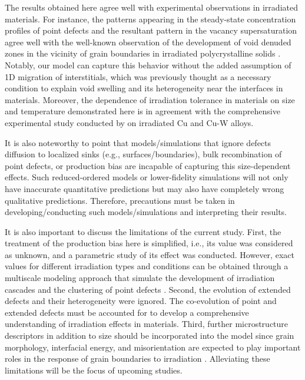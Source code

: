 \documentclass[utf8]{frontiersSCNS} %
\begin{document}
The results obtained here agree well with experimental observations in irradiated materials. For instance, the patterns appearing in the steady-state concentration profiles of point defects and the resultant pattern in the vacancy supersaturation agree well with the well-known observation of the development of void denuded zones in the vicinity of grain boundaries in irradiated polycrystalline solids \citep{was2017}. Notably, our model can capture this behavior without the added assumption of 1D migration of interstitials, which was previously thought as a necessary condition to explain void swelling and its heterogeneity near the interfaces in materials. Moreover, the dependence of irradiation tolerance in materials on size and temperature demonstrated here is in agreement with the comprehensive experimental study conducted by \citep{mao2019} on irradiated Cu and Cu-W alloys.

It is also noteworthy to point that models/simulations that ignore defects diffusion to localized sinks (e.g., surfaces/boundaries), bulk recombination of point defects, or production bias are incapable of capturing this size-dependent effects. Such reduced-ordered models or lower-fidelity simulations will not only have inaccurate quantitative predictions but may also have completely wrong qualitative predictions. Therefore, precautions must be taken in developing/conducting such models/simulations and interpreting their results.

It is also important to discuss the limitations of the current study. First, the treatment of the production bias here is simplified, i.e., its value was considered as unknown, and a parametric study of its effect was conducted. However, exact values for different irradiation types and conditions can be obtained through a multiscale modeling approach that simulate the development of irradiation cascades and the clustering of point defects \citep{was2017}. Second, the evolution of extended defects and their heterogeneity were ignored. The co-evolution of point and extended defects must be accounted for to develop a comprehensive understanding of irradiation effects in materials. Third, further microstructure descriptors in addition to size should be incorporated into the model since grain morphology, interfacial energy, and misorientation are expected to play important roles in the response of grain boundaries to irradiation \citep{was2017}. Alleviating these limitations will be the focus of upcoming studies.
\end{document}
